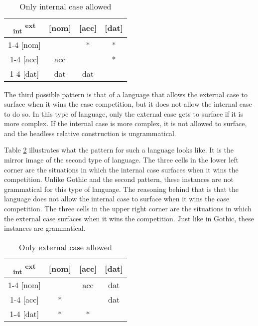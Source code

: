 \begin{table}[H]
  \center
  \caption{Only internal case allowed}
  \begin{tabular}{c|c|c|c}
    \toprule
    \textsubscript{\ac{int}} \textsuperscript{\ac{ext}}
           & [\ac{nom}]
           & [\ac{acc}]
           & [\ac{dat}]
           \\ \cmidrule{1-4}
       [\ac{nom}]
           & \xcancel{\phantom{xx}}
           & *
           & *
           \\ \cmidrule{1-4}
       [\ac{acc}]
           & \ac{acc}
           & \xcancel{\phantom{xx}}
           & *
           \\ \cmidrule{1-4}
       [\ac{dat}]
           & \ac{dat}
           & \ac{dat}
           & \xcancel{\phantom{xx}}
           \\
     \bottomrule
  \end{tabular}
    \label{tbl:case-competition-only-int}
\end{table}

The third possible pattern is that of a language that allows the external case to surface when it wins the case competition, but it does not allow the internal case to do so. In this type of language, only the external case gets to surface if it is more complex. If the internal case is more complex, it is not allowed to surface, and the headless relative construction is ungrammatical.

Table \ref{tbl:case-competition-only-ext} illustrates what the pattern for such a language looks like. It is the mirror image of the second type of language.
The three cells in the lower left corner are the situations in which the internal case surfaces when it wins the competition. Unlike Gothic and the second pattern, these instances are not grammatical for this type of language. The reasoning behind that is that the language does not allow the internal case to surface when it wins the case competition.
The three cells in the upper right corner are the situations in which the external case surfaces when it wins the competition. Just like in Gothic, these instances are grammatical.

\begin{table}[H]
  \center
  \caption{Only external case allowed}
  \begin{tabular}{c|c|c|c}
    \toprule
    \textsubscript{\ac{int}} \textsuperscript{\ac{ext}}
           & [\ac{nom}]
           & [\ac{acc}]
           & [\ac{dat}]
           \\ \cmidrule{1-4}
       [\ac{nom}]
           & \xcancel{\phantom{xx}}
           & \ac{acc}
           & \ac{dat}
           \\ \cmidrule{1-4}
       [\ac{acc}]
           & *
           & \xcancel{\phantom{xx}}
           & \ac{dat}
           \\ \cmidrule{1-4}
       [\ac{dat}]
           & *
           & *
           & \xcancel{\phantom{xx}}
           \\
     \bottomrule
  \end{tabular}
    \label{tbl:case-competition-only-ext}
\end{table}

